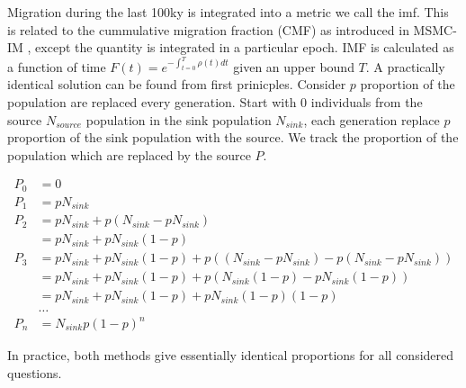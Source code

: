 Migration during the last 100ky is integrated into a metric we call the \gls{imf}. This is related to the cummulative migration fraction (CMF) as introduced in MSMC-IM \cite{Wang2019a}, except the quantity is integrated in a particular epoch. IMF is calculated as a function of time $F(t) = e^{- \int_{t=0}^T \rho(t) dt}$ given an upper bound $T$. A practically identical solution can be found from first prinicples. Consider $p$ proportion of the population are replaced every generation. Start with 0 individuals from the source $N_{source}$ population in the sink population $N_{sink}$, each generation replace $p$ proportion of the sink population with the source. We track the proportion of the population which are replaced by the source $P$.  


$$ \begin{aligned} P_0 &= 0 \\ P_1 &= pN_{sink} \\ P_2 &= pN_{sink} + p(N_{sink} - pN_{sink}) \\ &= pN_{sink} + pN_{sink}(1-p) \\ P_3 &= pN_{sink} + pN_{sink}(1-p) + p((N_{sink}-pN_{sink}) - p(N_{sink}-pN_{sink})) \\ &= pN_{sink} + pN_{sink}(1-p)+p(N_{sink}(1-p)-pN_{sink}(1-p)) \\ &= pN_{sink}+pN_{sink}(1-p)+pN_{sink}(1-p)(1-p) \\ &\dots \\ P_n &=N_{sink}p(1-p)^n \end{aligned} $$

In practice, both methods give essentially identical proportions for all considered questions. 

